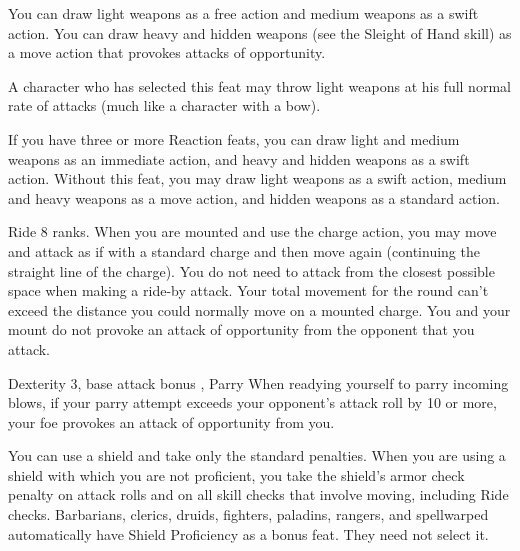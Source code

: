  You can draw light weapons as a free action and medium weapons as a swift action. You can draw heavy and hidden weapons (see the Sleight of Hand skill) as a move action that provokes attacks of opportunity.
\par A character who has selected this feat may throw light weapons at his full normal rate of attacks (much like a character with a bow).

If you have three or more Reaction feats, you can draw light and medium weapons as an immediate action, and heavy and hidden weapons as a swift action.
 Without this feat, you may draw light weapons as a swift action, medium and heavy weapons as a move action, and hidden weapons as a standard action.


\featpre Ride 8 ranks.
 When you are mounted and use the charge action, you may move and attack as if with a standard charge and then move again (continuing the straight line of the charge). You do not need to attack from the closest possible space when making a ride-by attack. Your total movement for the round can't exceed the distance you could normally move on a mounted charge. You and your mount do not provoke an attack of opportunity from the opponent that you attack.

\featpre Dexterity 3, base attack bonus , Parry
\featben When readying yourself to parry incoming blows, if your parry attempt exceeds your opponent's attack roll by 10 or more, your foe provokes an attack of opportunity from you.

 You can use a shield and take only the standard penalties.
 When you are using a shield with which you are not proficient, you take the shield's armor check penalty on attack rolls and on all skill checks that involve moving, including Ride checks.
 Barbarians, clerics, druids, fighters, paladins, rangers, and spellwarped automatically have Shield Proficiency as a bonus feat. They need not select it.

